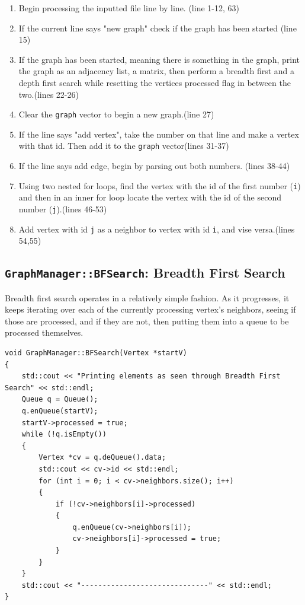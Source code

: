 \documentclass[letterpaper, 10pt]{article}
\begin{document}
\begin{enumerate}
    \item Begin processing the inputted file line by line. (line 1-12, 63)
    \item If the current line says "new graph" check if the graph has been started (line 15)
    \item If the graph has been started, meaning there is something in the graph, print the graph as an adjacency list, a matrix, then perform a breadth first and a depth first search while resetting the vertices processed flag in between the two.(lines 22-26)
    \item Clear the \texttt{graph} vector to begin a new graph.(line 27)
    \item If the line says "add vertex",  take the number on that line and make a vertex with that id. Then add it to the \texttt{graph} vector(lines 31-37)
    \item If the line says add edge, begin by parsing out both numbers. (lines 38-44)
    \item Using two nested for loops, find the vertex with the id of the first number (\texttt{i}) and then in an inner for loop locate the vertex with the id of the second number  (\texttt{j}).(lines 46-53)
    \item Add vertex with id \texttt{j} as a neighbor to vertex with id \texttt{i}, and vise versa.(lines 54,55)
    
\end{enumerate}












\subsection{\texttt{GraphManager::BFSearch}: Breadth First Search}

Breadth first search operates in a relatively simple fashion. As it progresses, it keeps iterating over each of the currently processing vertex's neighbors, seeing if those are processed, and if they are not, then putting them into a queue to be processed themselves.

\begin{addmargin}[-5em]{1em}
\begin{small}
\begin{verbatim}
void GraphManager::BFSearch(Vertex *startV)
{
	std::cout << "Printing elements as seen through Breadth First Search" << std::endl;
	Queue q = Queue();
	q.enQueue(startV);
	startV->processed = true;
	while (!q.isEmpty())
	{
		Vertex *cv = q.deQueue().data;
		std::cout << cv->id << std::endl;
		for (int i = 0; i < cv->neighbors.size(); i++)
		{
			if (!cv->neighbors[i]->processed)
			{
				q.enQueue(cv->neighbors[i]);
				cv->neighbors[i]->processed = true;
			}
		}
	}
	std::cout << "------------------------------" << std::endl;
}
\end{verbatim}
\end{small}
\end{addmargin}
\end{document}
